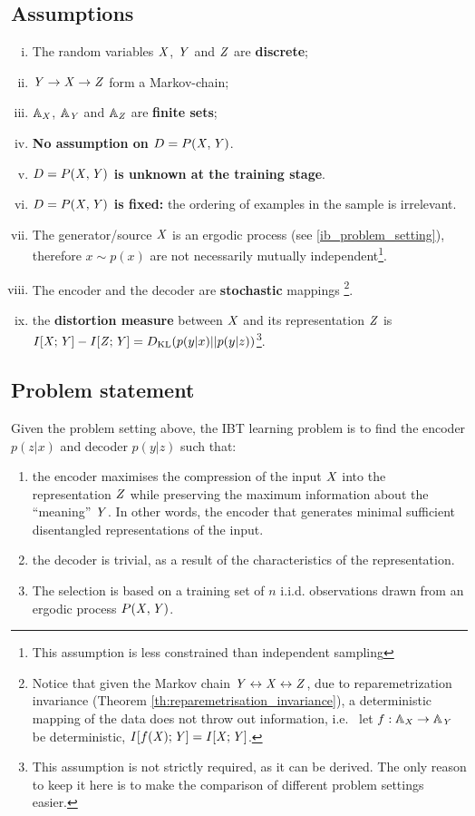   \subsection{Assumptions}\label{sec:ibt_learning_assumptions}
  \begin{enumerate}
    [i.]
    \item The random variables ${\mathit{X}}$, ${\mathit{Y}}$ and ${\mathit{Z}}$ are \textbf{discrete};
    \item ${\mathit{Y}} \to {\mathit{X}} \to {\mathit{Z}}$ form a Markov-chain;
    \item ${\mathbb{A}}_{{\mathit{X}}}$, ${\mathbb{A}}_{{\mathit{Y}}}$ and ${\mathbb{A}}_{{\mathit{Z}}}$ are \textbf{finite sets};
    \item \textbf{No assumption on \(D=P({\mathit{X}},{\mathit{Y}})\)}.
    \item \textbf{\(D=P({\mathit{X}},{\mathit{Y}})\) is unknown at the training stage}.
    \item \textbf{\(D=P({\mathit{X}},{\mathit{Y}})\) is fixed:} the ordering of examples in the sample is irrelevant.
    \item The generator/source ${\mathit{X}}$ is an ergodic process (see \cref{ib_problem_setting}), therefore $x \sim p(x)$ are not necessarily mutually independent\footnote{This assumption is less constrained than independent sampling}.
		\item The encoder and the decoder are \textbf{stochastic} mappings \footnote{Notice that given the Markov chain ${\mathit{Y}} \leftrightarrow {\mathit{X}} \leftrightarrow {\mathit{Z}}$, due to reparemetrization invariance (Theorem \ref{th:reparemetrisation_invariance}), a deterministic mapping of the data does not throw out information, i.e. \ let $f:{\mathbb{A}}_{{\mathit{X}}} \to {\mathbb{A}}_{{\mathit{Y}}}$ be deterministic, $I[f({\mathit{X}});{\mathit{Y}}]=I[{{\mathit{X}}};{{\mathit{Y}}}]$.}.
		\item the \textbf{distortion measure} between ${\mathit{X}}$ and its representation ${\mathit{Z}}$ is $I[{{\mathit{X}}};{{\mathit{Y}}}] - I[{{\mathit{Z}}};{{\mathit{Y}}}] = D_{\mathrm{KL}}(p(y|x)||p(y|z))$\footnote{This assumption is not strictly required, as it can be derived. The only reason to keep it here is to make the comparison of different problem settings easier.}.
  \end{enumerate}
\subsection{Problem statement}
Given the problem setting above, the \ac{IBT} learning problem is to find the encoder $p(z|x)$ and decoder $p(y|z)$ such that:
\begin{enumerate}
  \item the encoder maximises the compression of the input ${\mathit{X}}$ into the representation ${\mathit{Z}}$ while preserving the maximum information about the ``meaning'' ${\mathit{Y}}$. In other words, the encoder that generates minimal sufficient disentangled representations of the input.
  \item the decoder is trivial, as a result of the characteristics of the representation.
  \item The selection is based on a training set of $n$ i.i.d. observations drawn from an ergodic process $P({\mathit{X}},{\mathit{Y}})$.
\end{enumerate}

